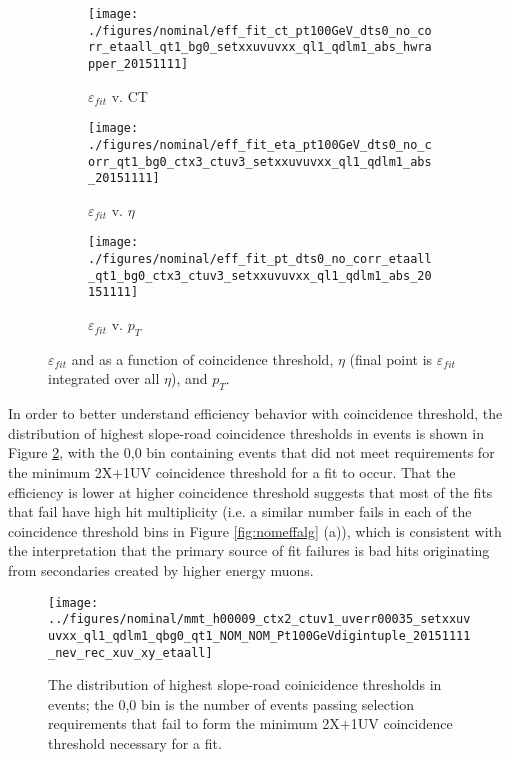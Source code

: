 \begin{figure}[!htbp]\captionsetup{justification=centering}
  \begin{center}
    \begin{subfigure}{0.3\textwidth}\caption{$\varepsilon_{fit}$ v. CT}\texttt{[image: ./figures/nominal/eff\_fit\_ct\_pt100GeV\_dts0\_no\_corr\_etaall\_qt1\_bg0\_setxxuvuvxx\_ql1\_qdlm1\_abs\_hwrapper\_20151111]}\end{subfigure}
    \begin{subfigure}{0.3\textwidth}\caption{$\varepsilon_{fit}$ v. $\eta$}\texttt{[image: ./figures/nominal/eff\_fit\_eta\_pt100GeV\_dts0\_no\_corr\_qt1\_bg0\_ctx3\_ctuv3\_setxxuvuvxx\_ql1\_qdlm1\_abs\_20151111]}\end{subfigure}
    \begin{subfigure}{0.3\textwidth}\caption{$\varepsilon_{fit}$ v. $p_T$}\texttt{[image: ./figures/nominal/eff\_fit\_pt\_dts0\_no\_corr\_etaall\_qt1\_bg0\_ctx3\_ctuv3\_setxxuvuvxx\_ql1\_qdlm1\_abs\_20151111]}\end{subfigure}
  \caption{\label{fig:nomefffit} $\varepsilon_{fit}$ and as a function of coincidence threshold, $\eta$ (final point is $\varepsilon_{fit}$ integrated over all $\eta$), and $p_T$.}
  \end{center}
\end{figure}

In order to better understand efficiency behavior with coincidence threshold, the distribution of highest slope-road coincidence thresholds in events is shown in Figure \ref{fig:ctrecodist}, with the 0,0 bin containing events that did not meet requirements for the minimum 2X+1UV coincidence threshold for a fit to occur.  That the efficiency is lower at higher coincidence threshold suggests that most of the fits that fail have high hit multiplicity (i.e. a similar number fails in each of the coincidence threshold bins in Figure \ref{fig:nomeffalg} (a)), which is consistent with the interpretation that the primary source of fit failures is bad hits originating from secondaries created by higher energy muons.

\begin{figure}[!htbp]\captionsetup{justification=centering}
  \centering
  \texttt{[image: ../figures/nominal/mmt\_h00009\_ctx2\_ctuv1\_uverr00035\_setxxuvuvxx\_ql1\_qdlm1\_qbg0\_qt1\_NOM\_NOM\_Pt100GeVdigintuple\_20151111\_nev\_rec\_xuv\_xy\_etaall]}
  \caption{\label{fig:ctrecodist} The distribution of highest slope-road coinicidence thresholds in events; the 0,0 bin is the number of events passing selection requirements that fail to form the minimum 2X+1UV coincidence threshold necessary for a fit.}
\end{figure}

